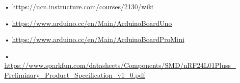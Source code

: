 \begin{enumerate}
	\item[•] \url{https://ucn.instructure.com/courses/2130/wiki}
	\item[•] \url{https://www.arduino.cc/en/Main/ArduinoBoardUno}
	\item[•] \url{https://www.arduino.cc/en/Main/ArduinoBoardProMini}
	\item[•] \url{https://www.sparkfun.com/datasheets/Components/SMD/nRF24L01Pluss_Preliminary_Product_Specification_v1_0.pdf}
\end{enumerate}


